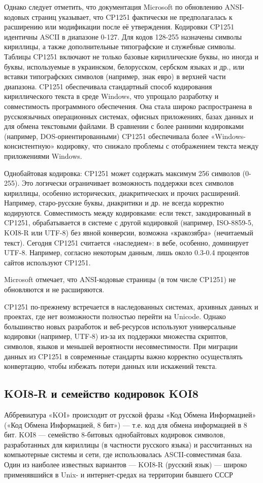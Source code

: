\documentclass{ou}
\begin{document}
Однако следует отметить, что документация Microsoft по обновлению ANSI-кодовых страниц указывает, что CP1251 фактически не предполагалась к расширению или модификации после её утверждения. Кодировки CP1251 идентичны ASCII в диапазоне 0-127. Для кодов 128-255 назначены символы кириллицы, а также дополнительные типографские и служебные символы. Таблицы CP1251 включают не только базовые кириллические буквы, но иногда и буквы, используемые в украинском, белорусском, сербском языках и др., или вставки типографских символов (например, знак евро) в верхней части диапазона. CP1251 обеспечивала стандартный способ кодирования кириллического текста в среде Windows, что упрощало разработку и совместимость программного обеспечения. Она стала широко распространена в русскоязычных операционных системах, офисных приложениях, базах данных и для обмена текстовыми файлами. В сравнении с более ранними кодировками (например, DOS-ориентированными) CP1251 обеспечивала более «Windows-консистентную» кодировку, что снижало проблемы с отображением текста между приложениями Windows.

Однобайтовая кодировка: CP1251 может содержать максимум 256 символов (0-255). Это логически ограничивает возможность поддержки всех символов кириллицы, особенно исторических, диакритических и прочих расширений. Например, старо-русские буквы, диакритики и др. не всегда корректно кодируются. Совместимость между кодировками: если текст, закодированный в CP1251, обрабатывается в системе с другой кодировкой (например, ISO-8859-5, KOI8-R или UTF-8) без явной конверсии, возможна «кракозябра» (нечитаемый текст). Сегодня CP1251 считается «наследием»: в вебе, особенно, доминирует UTF-8. Например, согласно некоторым данным, лишь около 0.3-0.4 процентов сайтов используют CP1251.

Microsoft отмечает, что ANSI-кодовые страницы (в том числе CP1251) не обновляются и не расширяются. 

CP1251 по-прежнему встречается в наследованных системах, архивных данных и проектах, где нет возможности полностью перейти на Unicode. Однако большинство новых разработок и веб-ресурсов используют универсальные кодировки (например, UTF‑8) из-за их поддержки множества скриптов, символов, языков и меньшей вероятности несовместимости. При миграции данных из CP1251 в современные стандарты важно корректно осуществлять конвертацию, чтобы избежать потери данных или искажений текста.
\newpage
\subsection{KOI8‑R и семейство кодировок KOI8}
Аббревиатура «KOI» происходит от русской фразы «Код Обмена Информацией» («Код Обмена Информацией, 8 бит») — т.е. код для обмена информацией в 8 бит. KOI8 — семейство 8-битовых однобайтовых кодировок символов, разработанных для кириллицы (в частности русского языка) и рассчитанных на компьютерные системы и сети, где использовалась ASCII-совместимая база. Один из наиболее известных вариантов — KOI8-R (русский язык) — широко применявшийся в Unix- и интернет-средах на территории бывшего СССР
\end{document}
